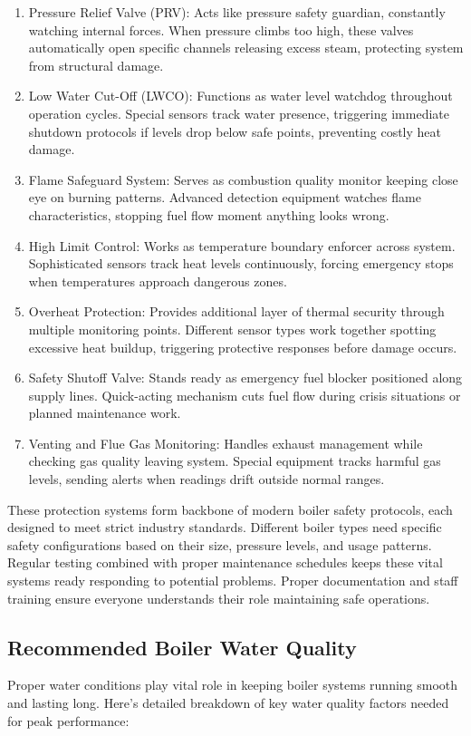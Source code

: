 \begin{enumerate}
    \item Pressure Relief Valve (PRV): Acts like pressure safety guardian, constantly watching internal forces. When pressure climbs too high, these valves automatically open specific channels releasing excess steam, protecting system from structural damage.
    \item Low Water Cut-Off (LWCO): Functions as water level watchdog throughout operation cycles. Special sensors track water presence, triggering immediate shutdown protocols if levels drop below safe points, preventing costly heat damage.
    \item Flame Safeguard System: Serves as combustion quality monitor keeping close eye on burning patterns. Advanced detection equipment watches flame characteristics, stopping fuel flow moment anything looks wrong.
    \item High Limit Control: Works as temperature boundary enforcer across system. Sophisticated sensors track heat levels continuously, forcing emergency stops when temperatures approach dangerous zones.
    \item Overheat Protection: Provides additional layer of thermal security through multiple monitoring points. Different sensor types work together spotting excessive heat buildup, triggering protective responses before damage occurs.
    \item Safety Shutoff Valve: Stands ready as emergency fuel blocker positioned along supply lines. Quick-acting mechanism cuts fuel flow during crisis situations or planned maintenance work.
    \item Venting and Flue Gas Monitoring: Handles exhaust management while checking gas quality leaving system. Special equipment tracks harmful gas levels, sending alerts when readings drift outside normal ranges.
\end{enumerate}
These protection systems form backbone of modern boiler safety protocols, each designed to meet strict industry standards. Different boiler types need specific safety configurations based on their size, pressure levels, and usage patterns. Regular testing combined with proper maintenance schedules keeps these vital systems ready responding to potential problems. Proper documentation and staff training ensure everyone understands their role maintaining safe operations.

\subsection{Recommended Boiler Water Quality}
Proper water conditions play vital role in keeping boiler systems running smooth and lasting long. Here's detailed breakdown of key water quality factors needed for peak performance:

